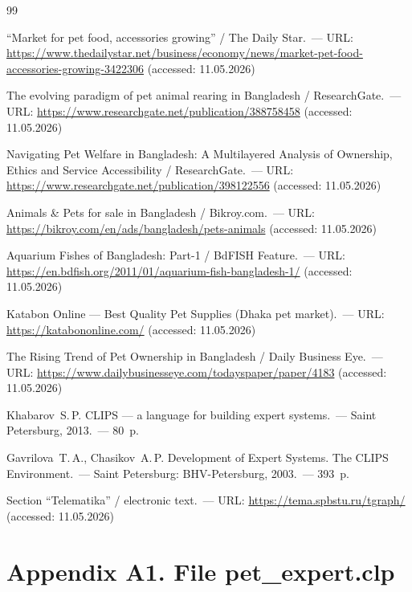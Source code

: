 \documentclass[a4paper,final]{article}
\begin{document}
\clearpage
\renewcommand{\refname}{References}
\begin{thebibliography}{99}

	``Market for pet food, accessories growing'' / The Daily Star.~---
	URL: \url{https://www.thedailystar.net/business/economy/news/market-pet-food-accessories-growing-3422306}
	(accessed: 11.05.2026)

	The evolving paradigm of pet animal rearing in Bangladesh / ResearchGate.~---
	URL: \url{https://www.researchgate.net/publication/388758458}
	(accessed: 11.05.2026)

	Navigating Pet Welfare in Bangladesh: A Multilayered Analysis of Ownership,
	Ethics and Service Accessibility / ResearchGate.~---
	URL: \url{https://www.researchgate.net/publication/398122556}
	(accessed: 11.05.2026)

	Animals \& Pets for sale in Bangladesh / Bikroy.com.~---
	URL: \url{https://bikroy.com/en/ads/bangladesh/pets-animals}
	(accessed: 11.05.2026)

	Aquarium Fishes of Bangladesh: Part-1 / BdFISH Feature.~---
	URL: \url{https://en.bdfish.org/2011/01/aquarium-fish-bangladesh-1/}
	(accessed: 11.05.2026)

	Katabon Online --- Best Quality Pet Supplies (Dhaka pet market).~---
	URL: \url{https://katabononline.com/}
	(accessed: 11.05.2026)

	The Rising Trend of Pet Ownership in Bangladesh / Daily Business Eye.~---
	URL: \url{https://www.dailybusinesseye.com/todayspaper/paper/4183}
	(accessed: 11.05.2026)

	Khabarov~S.\,P. CLIPS --- a language for building expert systems.~---
	Saint Petersburg, 2013.~--- 80~p.

	Gavrilova~T.\,A., Chasikov~A.\,P. Development of Expert Systems. The CLIPS Environment.~---
	Saint Petersburg: BHV-Petersburg, 2003.~--- 393~p.

	Section ``Telematika'' / electronic text.~---
	URL: \url{https://tema.spbstu.ru/tgraph/}
	(accessed: 11.05.2026)

\end{thebibliography}


\clearpage
\section*{Appendix A1. File pet\_expert.clp}
\label{app:clips}

\end{document}
